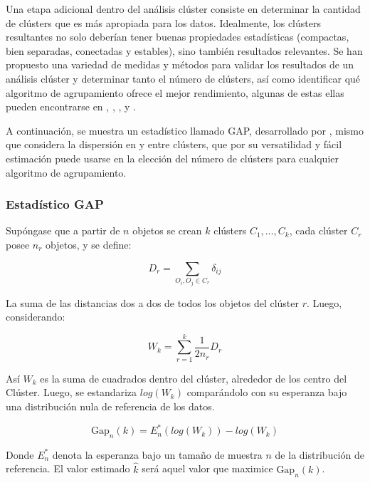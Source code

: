 \documentclass[12pt,oneside]{book}\usepackage[]{graphicx}\usepackage[]{color}
\theoremstyle{definition} %
\begin{document}
Una etapa adicional dentro del análisis clúster consiste en determinar la cantidad de clústers que es más apropiada para los datos. Idealmente, los clústers resultantes no solo deberían tener buenas propiedades estadísticas (compactas, bien separadas, conectadas y estables), sino también resultados relevantes. Se han propuesto una variedad de medidas y métodos para validar los resultados de un análisis clúster y determinar tanto el número de clústers, así como identificar qué algoritmo de agrupamiento ofrece el mejor rendimiento, algunas de estas ellas pueden encontrarse en \citeauthor{fraley1998many} \citeyear{fraley1998many}, \citeauthor{duda2001pattern} \citeyear{duda2001pattern}, \citeauthor{salvador2004determining} , y \citeauthor{kerr2001bootstrapping} \citeyear{kerr2001bootstrapping}. 


A continuación, se muestra un estadístico llamado GAP, desarrollado por \citeauthor{tibshirani2001estimating} \citeyear{tibshirani2001estimating}, mismo que considera la dispersión en y entre clústers, que por su versatilidad y fácil estimación puede usarse en la elección del número de clústers para cualquier algoritmo de agrupamiento.

\subsubsection{Estadístico GAP}

Supóngase que a partir de $n$ objetos se crean $k$ clústers $C_1,\dots,C_k$, cada clúster $C_r$ posee $n_r$ objetos, y se define:

\[
D_r = \sum_{O_i,O_j\in C_r} \delta_{ij} 
\]

La suma de las distancias dos a dos de todos los objetos del clúster $r$. Luego, considerando: 

\[
W_k = \sum_{r=1}^k \frac{1}{2n_r}D_r
\]

Así $W_k$ es la suma de cuadrados dentro del clúster, alrededor de los centro del Clúster. Luego, se estandariza  $log(W_k)$ comparándolo con su esperanza bajo una distribución nula de referencia de los datos.

\[
\text{Gap}_n(k) = E_n^*(log(W_k))-log(W_k)
\]

Donde $E_n^*$ denota la esperanza bajo un tamaño de muestra $n$ de la distribución de referencia. El valor estimado $\hat k$ será aquel valor que maximice $\text{Gap}_n(k)$.


\end{document}
